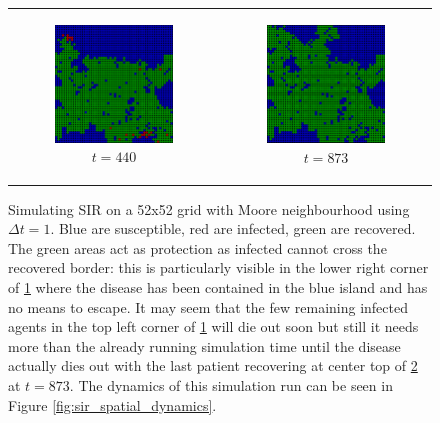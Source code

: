 \begin{figure}
\begin{center}
\begin{tabular}{c c}
		\begin{subfigure}[b]{0.4\textwidth}
			\centering
			\includegraphics[width=.6\textwidth, angle=0]{./../shared/fig/spatial/SIR_spatial_52x52_440time.png}
			\caption{$t = 440$}
			\label{fig:sir_spatial_440}
		\end{subfigure}
		
		& 
		
		\begin{subfigure}[b]{0.4\textwidth}
			\centering
			\includegraphics[width=.6\textwidth, angle=0]{./../shared/fig/spatial/SIR_spatial_52x52_873time.png}
			\caption{$t = 873$}
			\label{fig:sir_spatial_873}
		\end{subfigure}
	\end{tabular}
	
	\caption{Simulating SIR on a 52x52 grid with Moore neighbourhood using $\Delta t = 1$. Blue are susceptible, red are infected, green are recovered. The green areas act as protection as infected cannot cross the recovered border: this is particularly visible in the lower right corner of \ref{fig:sir_spatial_440} where the disease has been contained in the blue island and has no means to escape. It may seem that the few remaining infected agents in the top left corner of \ref{fig:sir_spatial_440} will die out soon but still it needs more than the already running simulation time until the disease actually dies out with the last patient recovering at center top of \ref{fig:sir_spatial_873} at $t = 873$. The dynamics of this simulation run can be seen in Figure \ref{fig:sir_spatial_dynamics}.} 
	\label{fig:sir_spatial}
\end{center}
\end{figure}

